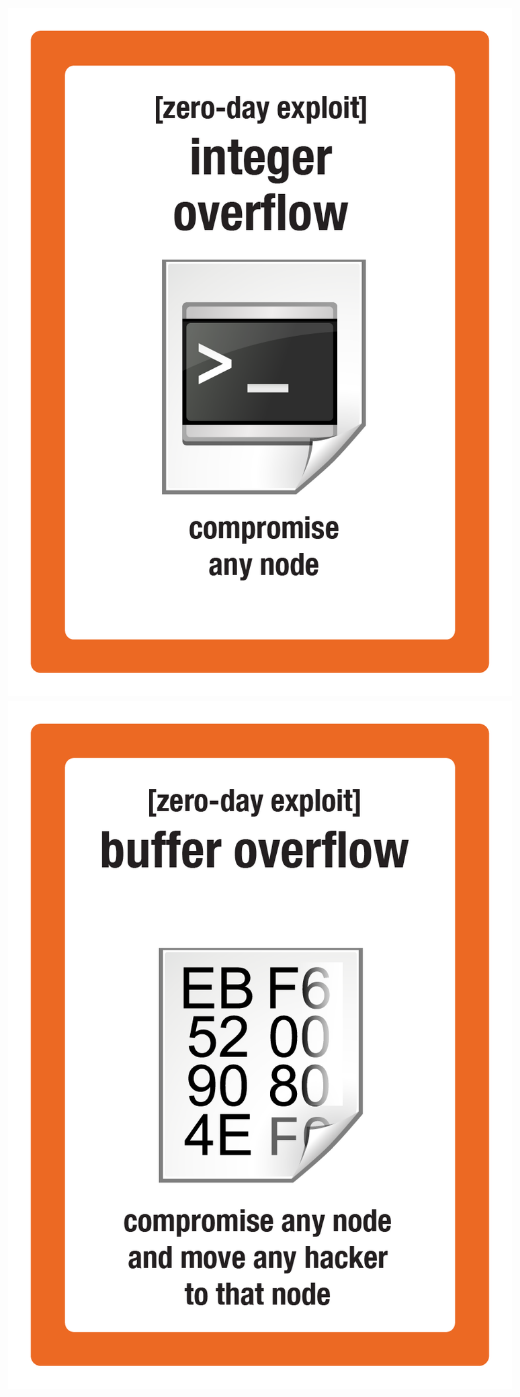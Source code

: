 \documentclass{letter}
\begin{document}
\includegraphics{lo0t/lo0t.exploit_integer_overflow}
\includegraphics{lo0t/lo0t.exploit_buffer_overflow}
\end{document}
